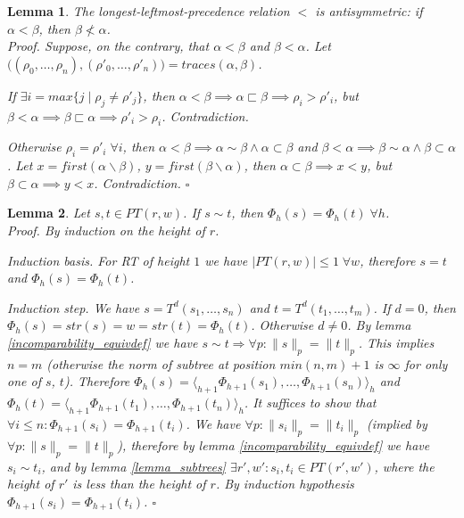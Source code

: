 \documentclass[AMA,STIX1COL]{WileyNJD-v2}
\newcommand{\Xl}{\langle}
\newcommand{\Xr}{\rangle}
\newtheorem{XLem}{Lemma}
\begin{document}
    \begin{XLem}\label{lemma_pe_order_antisymm}
    The longest-leftmost-precedence relation $<$ is antisymmetric:
    if $\alpha < \beta$, then $\beta \not< \alpha$.
    \\
    Proof.
    Suppose, on the contrary, that $\alpha < \beta$ and $\beta < \alpha$.
    Let $\big( (\rho_0, \dots, \rho_n), (\rho'_0, \dots, \rho'_n) \big) = traces(\alpha, \beta)$.

    \medskip

    If $\exists i = max \{j \mid \rho_j \neq \rho'_j \}$, then
    $\alpha < \beta \implies \alpha \sqsubset \beta \implies \rho_i > \rho'_i$, but
    $\beta < \alpha \implies \beta \sqsubset \alpha \implies \rho'_i > \rho_i$. Contradiction.

    \medskip

    Otherwise $\rho_i = \rho'_i \; \forall i$, then
    $\alpha < \beta \implies \alpha \sim \beta \wedge \alpha \subset \beta$ and
    $\beta < \alpha \implies \beta \sim \alpha \wedge \beta \subset \alpha$.
    Let
    $x = first (\alpha \backslash \beta)$,
    $y = first (\beta \backslash \alpha)$, then
    $\alpha \subset \beta \implies x < y$, but
    $\beta \subset \alpha \implies y < x$. Contradiction.
    $\square$
    \end{XLem}


    \begin{XLem}\label{lemma_pe_equiv}
    Let $s, t \in PT(r, w)$.
    If $s \sim t$, then $\Phi_{h}(s) = \Phi_{h}(t) \; \forall h$.
    \\
    Proof.
    By induction on the height of $r$.

    \medskip

    Induction basis.
    For RT of height $1$ we have
    $| PT(r, w) | \leq 1 \; \forall w$,
    therefore $s = t$ and $\Phi_{h}(s) = \Phi_{h}(t)$.

    \medskip

    Induction step.
    We have
    $s = T^{d} (s_1, \dots, s_n)$ and
    $t = T^{d} (t_1, \dots, t_m)$.
    If $d = 0$, then $\Phi_{h}(s) = str(s) = w = str(t) = \Phi_{h}(t)$.
    Otherwise $d \neq 0$.
    By lemma \ref{incomparability_equivdef} we have $s \sim t \Rightarrow \forall p: \|s\|_p = \|t\|_p$.
    This implies $n = m$ (otherwise the norm of subtree at position $min(n,m)+1$ is $\infty$ for only one of $s$, $t$).
    Therefore
    $\Phi_{h}(s) = \Xl_{h+1} \Phi_{h+1}(s_1), \dots, \Phi_{h+1}(s_n) \Xr_h$ and
    $\Phi_{h}(t) = \Xl_{h+1} \Phi_{h+1}(t_1), \dots, \Phi_{h+1}(t_n) \Xr_h$.
    It suffices to show that $\forall i \leq n: \Phi_{h+1}(s_i) = \Phi_{h+1}(t_i)$.
    We have $\forall p: \|s_i\|_p = \|t_i\|_p$ (implied by $\forall p: \|s\|_p = \|t\|_p$),
    therefore by lemma \ref{incomparability_equivdef} we have $s_i \sim t_i$,
    and by lemma \ref{lemma_subtrees} $\exists r', w': s_i, t_i \in PT(r', w')$,
    where the height of $r'$ is less than the height of $r$.
    By induction hypothesis $\Phi_{h+1}(s_i) = \Phi_{h+1}(t_i)$.
    $\square$
    \end{XLem}
\end{document}
